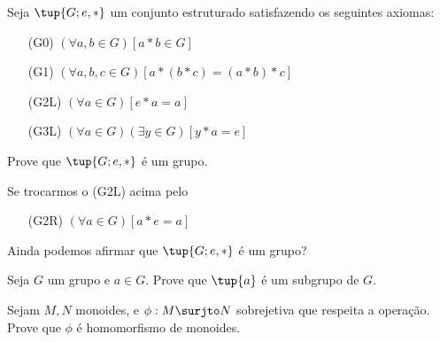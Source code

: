 \begin{exercise}


Seja $\tup{G; e, *}$ um conjunto estruturado satisfazendo os seguintes axiomas:

\begin{itemize}

\item[(G0)] $(\forall a, b \in G)[a * b \in G]$
\item[(G1)] $(\forall a, b, c \in G)[a * (b * c) = (a * b) * c]$
\item[(G2L)] $(\forall a \in G)[e * a = a]$
\item[(G3L)] $(\forall a \in G)(\exists y \in G)[y * a = e]$

\end{itemize}

Prove que $\tup{G; e, *}$ é um grupo.

\end{exercise}


\begin{exercise}


Se trocarmos o (G2L) acima pelo
	
\begin{itemize}
\item[(G2R)] $(\forall a \in G)[a * e = a]$
\end{itemize}

Ainda podemos afirmar que $\tup{G; e, *}$ é um grupo?

\end{exercise}


\begin{exercise}

%
%

Seja $G$ um grupo e $a \in G$. Prove que $\tup{a}$ é um subgrupo de $G$.

\end{exercise}


\begin{exercise}

%

Sejam $M, N$ monoides, e $\phi : M \surjto N$ sobrejetiva que respeita a operação. Prove que $\phi$ é homomorfismo de monoides. 

\end{exercise}


